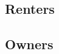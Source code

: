 \documentclass[review,12pt]{elsarticle}
\begin{document}
  \subsection{Renters}
  \subsection{Owners}








%
%






\end{document}
